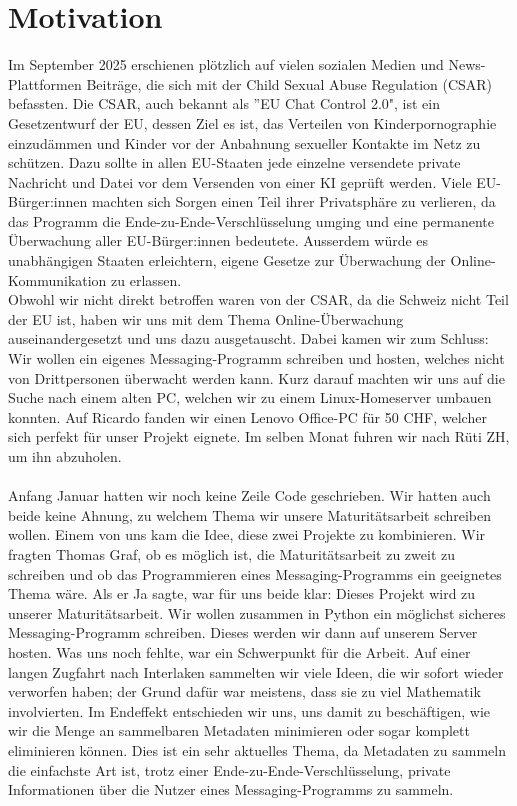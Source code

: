 \chapter{Motivation}
Im September 2025 erschienen plötzlich auf vielen sozialen Medien und News\hyp{}Plattformen Beiträge, die sich mit der Child Sexual Abuse Regulation (CSAR) befassten. Die CSAR, auch bekannt als ''EU Chat Control 2.0", ist ein Gesetzentwurf der EU, dessen Ziel es ist, das Verteilen von Kinderpornographie einzudämmen und Kinder vor der Anbahnung sexueller Kontakte im Netz zu schützen. Dazu sollte in allen EU-Staaten jede einzelne versendete private Nachricht und Datei vor dem Versenden von einer KI geprüft werden. Viele EU-Bürger:innen machten sich Sorgen einen Teil ihrer Privatsphäre zu verlieren, da das Programm die Ende-zu-Ende-Verschlüsselung umging und eine permanente Überwachung aller EU-Bürger:innen bedeutete. Ausserdem würde es unabhängigen Staaten erleichtern, eigene Gesetze zur Überwachung der Online-Kommunikation zu erlassen.
\\
Obwohl wir nicht direkt betroffen waren von der CSAR, da die Schweiz nicht Teil der EU ist, haben wir uns mit dem Thema Online-Überwachung auseinandergesetzt und uns dazu ausgetauscht. Dabei kamen wir zum Schluss: Wir wollen ein eigenes Messaging-Programm schreiben und hosten, welches nicht von Drittpersonen überwacht werden kann. Kurz darauf machten wir uns auf die Suche nach einem alten PC, welchen wir zu einem Linux-Homeserver umbauen konnten. Auf Ricardo fanden wir einen Lenovo Office-PC für 50 CHF, welcher sich perfekt für unser Projekt eignete. Im selben Monat fuhren wir nach Rüti ZH, um ihn abzuholen.
\\\\
Anfang Januar hatten wir noch keine Zeile Code geschrieben. Wir hatten auch beide keine Ahnung, zu welchem Thema wir unsere Maturitätsarbeit schreiben wollen. Einem von uns kam die Idee, diese zwei Projekte zu kombinieren. Wir fragten Thomas Graf, ob es möglich ist, die Maturitätsarbeit zu zweit zu schreiben und ob das Programmieren eines Messaging-Programms ein geeignetes Thema wäre. Als er Ja sagte, war für uns beide klar: Dieses Projekt wird zu unserer Maturitätsarbeit. Wir wollen zusammen in Python ein möglichst sicheres Messaging-Programm schreiben. Dieses werden wir dann auf unserem Server hosten. Was uns noch fehlte, war ein Schwerpunkt für die Arbeit. Auf einer langen Zugfahrt nach Interlaken sammelten wir viele Ideen, die wir sofort wieder verworfen haben; der Grund dafür war meistens, dass sie zu viel Mathematik involvierten. Im Endeffekt entschieden wir uns, uns damit zu beschäftigen, wie wir die Menge an sammelbaren Metadaten minimieren oder sogar komplett eliminieren können. Dies ist ein sehr aktuelles Thema, da Metadaten zu sammeln die einfachste Art ist, trotz einer Ende-zu-Ende-Verschlüsselung, private Informationen über die Nutzer eines Messaging-Programms zu sammeln. 